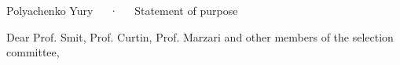 \documentclass[11pt, a4paper]{awesome-cv}
\begin{document}
\makecvheader[C]

\makecvfooter
  {\thepage}
  {Polyachenko Yury~~~·~~~Statement of purpose}
  {\thepage}

\vspace{25pt}
\hspace{5pt} Dear Prof. Smit, Prof. Curtin, Prof. Marzari and other members of the selection committee, 

\end{document}
